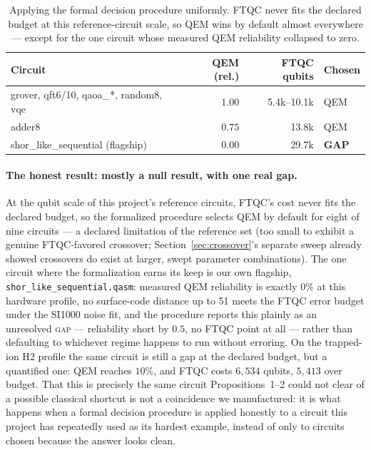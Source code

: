 \documentclass[9pt,twocolumn]{extarticle}
\begin{document}
\begin{table}[t]
\centering\footnotesize
\begin{tabular}{lrrl}
\toprule
Circuit & QEM (rel.) & FTQC qubits & Chosen \\
\midrule
grover, qft6/10, qaoa\_*, random8, vqe & $1.00$ & 5.4k--10.1k & QEM \\
adder8 & $0.75$ & 13.8k & QEM \\
shor\_like\_sequential (flagship) & $\mathbf{0.00}$ & 29.7k & \textbf{GAP} \\
\bottomrule
\end{tabular}
\caption{Applying the formal decision procedure uniformly. FTQC never
fits the declared budget at this reference-circuit scale, so QEM wins by
default almost everywhere --- except for the one circuit whose measured
QEM reliability collapsed to zero.}
\label{tab:regime-decision}
\end{table}

\paragraph{The honest result: mostly a null result, with one real gap.}
At the qubit scale of this project's reference circuits, FTQC's cost
never fits the declared budget, so the formalized procedure selects QEM
by default for eight of nine circuits --- a declared limitation of the
reference set (too small to exhibit a genuine FTQC-favored crossover;
Section~\ref{sec:crossover}'s separate sweep already showed crossovers do
exist at larger, swept parameter combinations). The one circuit where the
formalization earns its keep is our own flagship,
\texttt{shor\_like\_sequential.qasm}: measured QEM reliability is exactly
$0\%$ at this hardware profile, no surface-code distance up to 51 meets the
FTQC error budget under the SI1000 noise fit, and the procedure reports this
plainly as an unresolved \textsc{gap} --- reliability short by $0.5$, no
FTQC point at all --- rather than defaulting to whichever regime happens to
run without erroring. On the trapped-ion H2 profile the same circuit is
still a gap at the declared budget, but a quantified one: QEM reaches
$10\%$, and FTQC costs $6{,}534$ qubits, $5{,}413$ over budget. That this is precisely the same circuit
Propositions~1--2 could not clear of a possible classical shortcut is not
a coincidence we manufactured: it is what happens when a formal decision
procedure is applied honestly to a circuit this project has repeatedly
used as its hardest example, instead of only to circuits chosen because
the answer looks clean.
\end{document}
